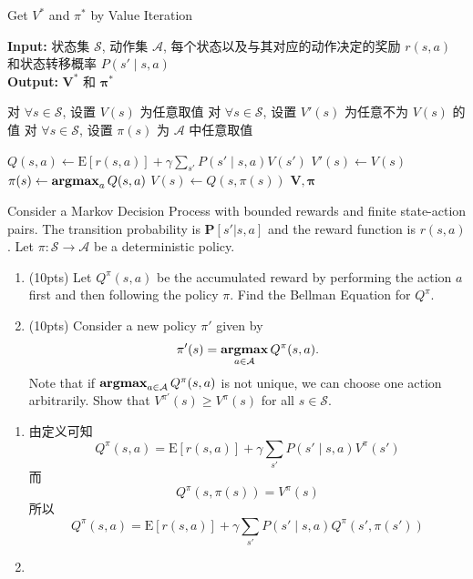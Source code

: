 \documentclass[11pt,letter,notitlepage]{article}
\DeclareMathOperator*{\argmax}{\bf argmax}
\newcommand{\expect}[1]{\text{E} [#1]}
\begin{document}
\begin{algorithm}
	\caption{Get $V^*$ and $\pi^*$ by Value Iteration}
	\label{alg:value_iteration}
	\textbf{Input:} 状态集 $\mathcal{S}$, 动作集 $\mathcal{A}$, 每个状态以及与其对应的动作决定的奖励 $r(s,a)$ 和状态转移概率 $P(s'\mid s,a)$ \\
	\textbf{Output:}  $\mathbf{V}^*$ 和 $\mathbf{\pi}^*$
	\begin{algorithmic}[1]
		\STATE 对 $\forall s\in \mathcal{S}$, 设置 $V(s)$ 为任意取值
		\STATE 对 $\forall s\in \mathcal{S}$, 设置 $V'(s)$ 为任意不为 $V(s)$ 的值
		\STATE 对 $\forall s\in \mathcal{S}$, 设置 $\pi(s)$ 为 $\mathcal{A}$ 中任意取值

		\STATE $Q(s,a)\leftarrow \expect{r(s,a)}+\gamma \sum_{s'}P(s'\mid s,a)V(s')$
		\ENDFOR
		\STATE $V'(s)\leftarrow V(s)$
		\STATE $\pi(s)\leftarrow \argmax_a Q(s,a)$
		\STATE $V(s)\leftarrow Q(s,\pi(s))$
		\ENDFOR
		\ENDWHILE
		\RETURN $\mathbf{V}, \mathbf{\pi}$
	\end{algorithmic}
\end{algorithm}

\newpage
\begin{exercise}
	Consider a Markov Decision Process with bounded rewards and finite state-action pairs. The transition probability is $\mathbf{P}[s'|s,a]$ and the reward function is $r(s,a)$. Let $\pi:\mathcal{S}\rightarrow\mathcal{A}$ be a deterministic policy.
	\begin{enumerate}
		\item (10pts) Let $Q^\pi (s,a)$ be the accumulated reward by performing the action $a$ first and then following the policy $\pi$. Find the Bellman Equation for $Q^\pi$.
		\item (10pts) Consider a new policy $\pi'$ given by
		      \begin{align*}
			      \pi'(s)=\argmax_{a\in\mathcal{A}} Q^\pi(s,a).
		      \end{align*}
		      Note that if $\argmax_{a\in\mathcal{A}} Q^\pi(s,a)$ is not unique, we can choose one action arbitrarily. Show that  $V^{\pi'}(s) \geq V^\pi(s)$ for all $s\in \mathcal{S}$.
	\end{enumerate}
\end{exercise}

\begin{solution}
	\begin{enumerate}
		\item 由定义可知
		      $$Q^\pi(s,a)=\expect{r(s,a)}+\gamma \sum_{s'} P(s'\mid s,a)V^\pi(s')$$
		      而
		      $$Q^\pi(s,\pi(s))=V^\pi(s)$$
		      所以
		      $$Q^\pi(s,a)=\expect{r(s,a)}+\gamma \sum_{s'} P(s'\mid s,a)Q^\pi(s',\pi(s'))$$
		\item
	\end{enumerate}
\end{solution}



% 
%

\end{document}
